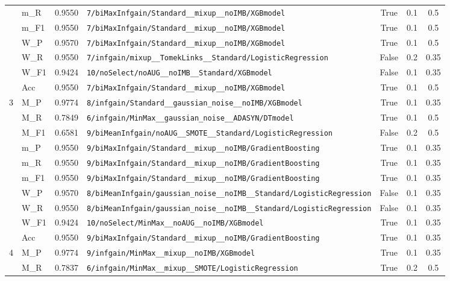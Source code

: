 \begin{table}[htbp]
\begin{tabular}{|c|l|c|>{\ttfamily\footnotesize}p{7.2cm}|c|c|c|}
 & m\_R & 0.9550 & \texttt{7/biMaxInfgain/Standard\_\_mixup\_\_noIMB/XGBmodel} & True & 0.1 & 0.5 \\
 & m\_F1 & 0.9550 & \texttt{7/biMaxInfgain/Standard\_\_mixup\_\_noIMB/XGBmodel} & True & 0.1 & 0.5 \\
 & W\_P & 0.9570 & \texttt{7/biMaxInfgain/Standard\_\_mixup\_\_noIMB/XGBmodel} & True & 0.1 & 0.5 \\
 & W\_R & 0.9550 & \texttt{7/infgain/mixup\_\_TomekLinks\_\_Standard/LogisticRegression} & False & 0.2 & 0.35 \\
 & W\_F1 & 0.9424 & \texttt{10/noSelect/noAUG\_\_noIMB\_\_Standard/XGBmodel} & False & 0.1 & 0.35 \\
 & Acc & 0.9550 & \texttt{7/biMaxInfgain/Standard\_\_mixup\_\_noIMB/XGBmodel} & True & 0.1 & 0.5 \\
\hline
\multirow{10}{*}{3} & M\_P & 0.9774 & \texttt{8/infgain/Standard\_\_gaussian\_noise\_\_noIMB/XGBmodel} & True & 0.1 & 0.35 \\
 & M\_R & 0.7849 & \texttt{6/infgain/MinMax\_\_gaussian\_noise\_\_ADASYN/DTmodel} & True & 0.1 & 0.5 \\
 & M\_F1 & 0.6581 & \texttt{9/biMeanInfgain/noAUG\_\_SMOTE\_\_Standard/LogisticRegression} & False & 0.2 & 0.5 \\
 & m\_P & 0.9550 & \texttt{9/biMaxInfgain/Standard\_\_mixup\_\_noIMB/GradientBoosting} & True & 0.1 & 0.35 \\
 & m\_R & 0.9550 & \texttt{9/biMaxInfgain/Standard\_\_mixup\_\_noIMB/GradientBoosting} & True & 0.1 & 0.35 \\
 & m\_F1 & 0.9550 & \texttt{9/biMaxInfgain/Standard\_\_mixup\_\_noIMB/GradientBoosting} & True & 0.1 & 0.35 \\
 & W\_P & 0.9570 & \texttt{8/biMeanInfgain/gaussian\_noise\_\_noIMB\_\_Standard/LogisticRegression} & False & 0.1 & 0.35 \\
 & W\_R & 0.9550 & \texttt{8/biMeanInfgain/gaussian\_noise\_\_noIMB\_\_Standard/LogisticRegression} & False & 0.1 & 0.35 \\
 & W\_F1 & 0.9424 & \texttt{10/noSelect/MinMax\_\_noAUG\_\_noIMB/XGBmodel} & True & 0.1 & 0.35 \\
 & Acc & 0.9550 & \texttt{9/biMaxInfgain/Standard\_\_mixup\_\_noIMB/GradientBoosting} & True & 0.1 & 0.35 \\
\hline
\multirow{10}{*}{4} & M\_P & 0.9774 & \texttt{9/infgain/MinMax\_\_mixup\_\_noIMB/XGBmodel} & True & 0.1 & 0.35 \\
 & M\_R & 0.7837 & \texttt{6/infgain/MinMax\_\_mixup\_\_SMOTE/LogisticRegression} & True & 0.2 & 0.5 \\

\end{tabular}
\end{table}

